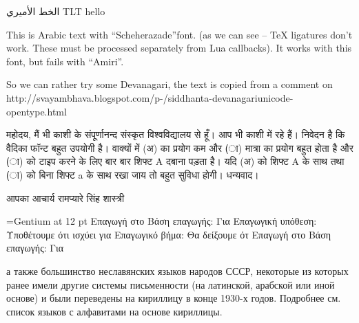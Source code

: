 \documentclass{article}
\begin{document}
 الخط الأميري {\textdir TLT hello}

\egroup

\ahoj
{}

This is  Arabic text with ``Scheherazade''font. (as we can see -- TeX ligatures
don't work. These must be processed separately from Lua callbacks). 
It works with this font, but fails with ``Amiri''. 

\siddhanta
So we can rather try some Devanagari, the text is copied from a comment on http://svayambhava.\-blogspot.com\-/p\--/\-sidd\-hanta-\-deva\-na\-ga\-ri\-unicode-\-open\-type.html


महोदय,
मैं भी काशी के संपूर्णानन्द संस्कृत विश्वविद्यालय से हूँ। आप भी काशी में रहे हैं।
निवेदन है कि वैदिका फॉन्ट बहुत उपयोगी है। वाक्यों में (अ) का प्रयोग कम और (ा) मात्रा का प्रयोग बहुत होता है और (ा) को टाइप करने के लिए बार बार शिफ्ट A दबाना पड़ता है। यदि (अ) को शिफ्ट A के साथ तथा (ा) को बिना शिफ्ट a के साथ रखा जाय तो बहुत सुविधा होगी।
धन्यवाद।

आपका
आचार्य रामप्यारे सिंह शास्त्री

\font\gentium={Gentium} at 12 pt
\gentium
Επαγωγή στο 
Βάση επαγωγής: Για 
Επαγωγική υπόθεση: Υποθέτουμε ότι ισχύει για 
Επαγωγικό βήμα: Θα δείξουμε ότ
Επαγωγή στο
Βάση επαγωγής: Για 

\gentium

а также большинство неславянских языков народов СССР, некоторые из которых
ранее имели другие системы письменности (на латинской, арабской или иной
основе) и были переведены на кириллицу в конце 1930-х годов. Подробнее см.
список языков с алфавитами на основе кириллицы.  
\end{document}
